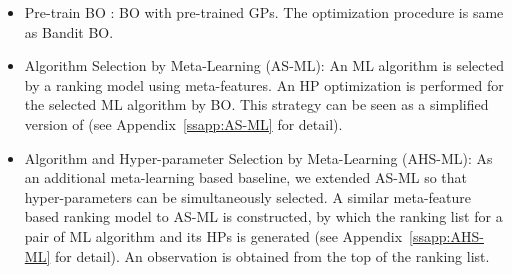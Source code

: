\begin{itemize}
  \item %
	Pre-train BO \cite{wang2024pre}: BO with pre-trained GPs. 
	The optimization procedure is same as Bandit BO.

  \item %
	Algorithm Selection by Meta-Learning (AS-ML): An ML algorithm is selected by a ranking model using meta-features. 
	An HP optimization is performed for the selected ML algorithm by BO.
	This strategy can be seen as a simplified version of \cite{mu2022auto} (see Appendix~\ref{ssapp:AS-ML} for detail). 

  \item %
	Algorithm and Hyper-parameter Selection by Meta-Learning (AHS-ML): As an additional meta-learning based baseline, we extended AS-ML so that hyper-parameters can be simultaneously selected.
	A similar meta-feature based ranking model to AS-ML is constructed, by which the ranking list for a pair of ML algorithm and its HPs is generated (see Appendix~\ref{ssapp:AHS-ML} for detail). 
	An observation is obtained from the top of the ranking list. 

\end{itemize}

